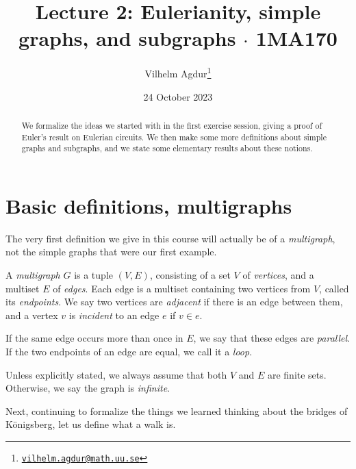 \documentclass[nobib]{tufte-handout}
\title{Lecture 2: Eulerianity, simple graphs, and subgraphs $\cdot$ 1MA170}
\author[Vilhelm Agdur]{Vilhelm Agdur\thanks{\href{mailto:vilhelm.agdur@math.uu.se}{\nolinkurl{vilhelm.agdur@math.uu.se}}}}
\date{24 October 2023}
\begin{document}
\maketitle%

\begin{abstract}
\noindent
We formalize the ideas we started with in the first exercise session, giving a proof of Euler's result on Eulerian circuits. We then make some more definitions about simple graphs and subgraphs, and we state some elementary results about these notions.
\end{abstract}

\section{Basic definitions, multigraphs}

The very first definition we give in this course will actually be of a \emph{multigraph}, not the simple graphs that were our first example.

\begin{definition}
    A \emph{multigraph} $G$ is a tuple $(V, E)$, consisting of a set $V$ of \emph{vertices}, and a multiset $E$ of \emph{edges}. Each edge is a multiset containing two vertices from $V$, called its \emph{endpoints}. We say two vertices are \emph{adjacent} if there is an edge between them, and a vertex $v$ is \emph{incident} to an edge $e$ if $v \in e$.

    If the same edge occurs more than once in $E$, we say that these edges are \emph{parallel}. If the two endpoints of an edge are equal, we call it a \emph{loop}.

    Unless explicitly stated, we always assume that both $V$ and $E$ are finite sets. Otherwise, we say the graph is \emph{infinite}.
\end{definition}

Next, continuing to formalize the things we learned thinking about the bridges of Königsberg, let us define what a walk is.
\end{document}
